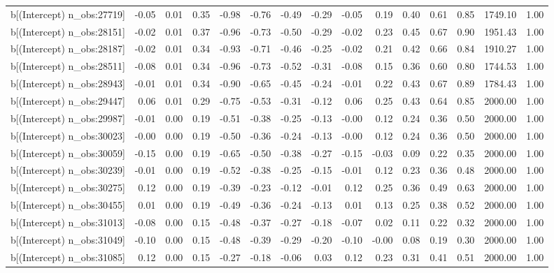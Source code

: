 \begin{table}[ht]
\begin{tabular}{rrrrrrrrrrrrrrr}
  b[(Intercept) n\_obs:27719] & -0.05 & 0.01 & 0.35 & -0.98 & -0.76 & -0.49 & -0.29 & -0.05 & 0.19 & 0.40 & 0.61 & 0.85 & 1749.10 & 1.00 \\ 
  b[(Intercept) n\_obs:28151] & -0.02 & 0.01 & 0.37 & -0.96 & -0.73 & -0.50 & -0.29 & -0.02 & 0.23 & 0.45 & 0.67 & 0.90 & 1951.43 & 1.00 \\ 
  b[(Intercept) n\_obs:28187] & -0.02 & 0.01 & 0.34 & -0.93 & -0.71 & -0.46 & -0.25 & -0.02 & 0.21 & 0.42 & 0.66 & 0.84 & 1910.27 & 1.00 \\ 
  b[(Intercept) n\_obs:28511] & -0.08 & 0.01 & 0.34 & -0.96 & -0.73 & -0.52 & -0.31 & -0.08 & 0.15 & 0.36 & 0.60 & 0.80 & 1744.53 & 1.00 \\ 
  b[(Intercept) n\_obs:28943] & -0.01 & 0.01 & 0.34 & -0.90 & -0.65 & -0.45 & -0.24 & -0.01 & 0.22 & 0.43 & 0.67 & 0.89 & 1784.43 & 1.00 \\ 
  b[(Intercept) n\_obs:29447] & 0.06 & 0.01 & 0.29 & -0.75 & -0.53 & -0.31 & -0.12 & 0.06 & 0.25 & 0.43 & 0.64 & 0.85 & 2000.00 & 1.00 \\ 
  b[(Intercept) n\_obs:29987] & -0.01 & 0.00 & 0.19 & -0.51 & -0.38 & -0.25 & -0.13 & -0.00 & 0.12 & 0.24 & 0.36 & 0.50 & 2000.00 & 1.00 \\ 
  b[(Intercept) n\_obs:30023] & -0.00 & 0.00 & 0.19 & -0.50 & -0.36 & -0.24 & -0.13 & -0.00 & 0.12 & 0.24 & 0.36 & 0.50 & 2000.00 & 1.00 \\ 
  b[(Intercept) n\_obs:30059] & -0.15 & 0.00 & 0.19 & -0.65 & -0.50 & -0.38 & -0.27 & -0.15 & -0.03 & 0.09 & 0.22 & 0.35 & 2000.00 & 1.00 \\ 
  b[(Intercept) n\_obs:30239] & -0.01 & 0.00 & 0.19 & -0.52 & -0.38 & -0.25 & -0.15 & -0.01 & 0.12 & 0.23 & 0.36 & 0.48 & 2000.00 & 1.00 \\ 
  b[(Intercept) n\_obs:30275] & 0.12 & 0.00 & 0.19 & -0.39 & -0.23 & -0.12 & -0.01 & 0.12 & 0.25 & 0.36 & 0.49 & 0.63 & 2000.00 & 1.00 \\ 
  b[(Intercept) n\_obs:30455] & 0.01 & 0.00 & 0.19 & -0.49 & -0.36 & -0.24 & -0.13 & 0.01 & 0.13 & 0.25 & 0.38 & 0.52 & 2000.00 & 1.00 \\ 
  b[(Intercept) n\_obs:31013] & -0.08 & 0.00 & 0.15 & -0.48 & -0.37 & -0.27 & -0.18 & -0.07 & 0.02 & 0.11 & 0.22 & 0.32 & 2000.00 & 1.00 \\ 
  b[(Intercept) n\_obs:31049] & -0.10 & 0.00 & 0.15 & -0.48 & -0.39 & -0.29 & -0.20 & -0.10 & -0.00 & 0.08 & 0.19 & 0.30 & 2000.00 & 1.00 \\ 
  b[(Intercept) n\_obs:31085] & 0.12 & 0.00 & 0.15 & -0.27 & -0.18 & -0.06 & 0.03 & 0.12 & 0.23 & 0.31 & 0.41 & 0.51 & 2000.00 & 1.00 \\ 

\end{tabular}
\end{table}
